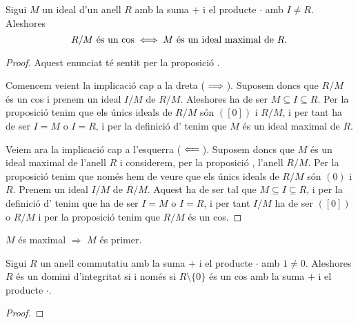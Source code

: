 \documentclass[../Apunts.tex]{subfiles}
\begin{document}
	\begin{proposition}
		\label{prop:condició equivalent a ideal maximal per R/M cos}
		Sigui \(M\) un ideal d'un anell \(R\) amb la suma \(+\) i el producte \(\cdot\) amb \(I\neq R\). Aleshores
		\[R/M\text{ és un cos}\iff M\text{ és un ideal maximal de }R.\]
		\begin{proof}
			Aquest enunciat té sentit per la proposició .
			
			Comencem veient la implicació cap a la dreta (\(\implies\)). Suposem doncs que \(R/M\) és un cos i prenem un ideal \(I/M\) %
			 de \(R/M\). Aleshores ha de ser \(M\subseteq I\subseteq R\). Per la proposició  tenim que els únics ideals de \(R/M\) són \(([0])\) i \(R/M\), i per tant ha de ser \(I=M\) o \(I=R\), i per la definició d' tenim que \(M\) és un ideal maximal de \(R\).
			
			Veiem ara la implicació cap a l'esquerra (\(\impliedby\)). Suposem doncs que \(M\) és un ideal maximal de l'anell \(R\) i considerem, per la proposició , l'anell \(R/M\). Per la proposició  tenim que només hem de veure que els únics ideals de \(R/M\) són \((0)\) i \(R\). Prenem un ideal \(I/M\) de \(R/M\). Aquest ha de ser tal que \(M\subseteq I\subseteq R\), i per la definició d' tenim que ha de ser \(I=M\) o \(I=R\), i per tant \(I/M\) ha de ser \(([0])\) o \(R/M\) i per la proposició  tenim que \(R/M\) és un cos.
		\end{proof}
	\end{proposition}
	\begin{corollary}
		\label{corollary:M maximal implica M primer}
		\(M\) és maximal \(\Longrightarrow\) \(M\) és primer.
	\end{corollary}
	\begin{theorem}
		Sigui \(R\) un anell commutatiu amb la suma \(+\) i el producte \(\cdot\) amb \(1\neq0\). Aleshores \(R\) és un domini d'integritat si i només si \(R\setminus\{0\}\) és un cos amb la suma \(+\) i el producte \(\cdot\). %
		\begin{proof}
		\end{proof}
	\end{theorem}
\end{document}
